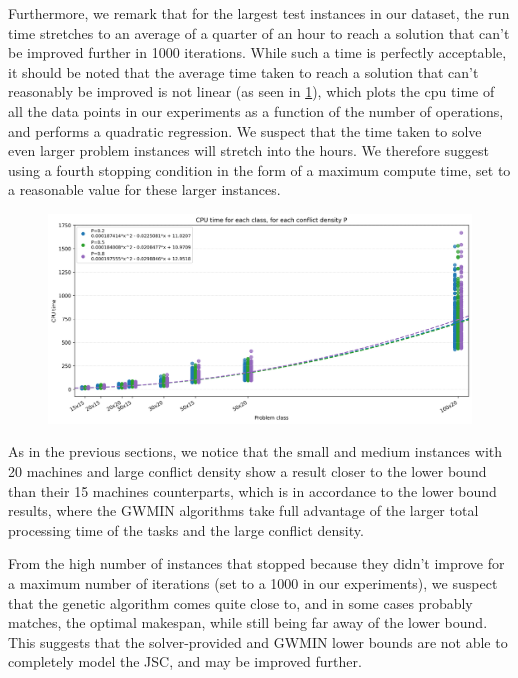 \documentclass{mimosis}
\begin{document}
Furthermore, we remark that for the largest test instances in our dataset, the run time stretches to an average of a quarter of an hour to reach a solution that can't be improved further in 1000 iterations. While such a time is perfectly acceptable, it should be noted that the average time taken to reach a solution that can't reasonably be improved is not linear (as seen in \cref{fig:quad_reg_cputime}), which plots the cpu time of all the data points in our experiments as a function of the number of operations, and performs a quadratic regression. We suspect that the time taken to solve even larger problem instances will stretch into the hours. We therefore suggest using a fourth stopping condition in the form of a maximum compute time, set to a reasonable value for these larger instances. 

\begin{figure}
\includegraphics[width=15cm]{cpu_time_evolution.png} 
\centering
{}
\label{fig:quad_reg_cputime}
\end{figure}

As in the previous sections, we notice that the small and medium instances with 20 machines and large conflict density show a result closer to the lower bound than their 15 machines counterparts, which is in accordance to the lower bound results, where the GWMIN algorithms take full advantage of the larger total processing time of the tasks and the large conflict density.

From the high number of instances that stopped because they didn't improve for a maximum number of iterations (set to a 1000 in our experiments), we suspect that the genetic algorithm comes quite close to, and in some cases probably matches, the optimal makespan, while still being far away of the lower bound. This suggests that the solver-provided and GWMIN lower bounds are not able to completely model the JSC, and may be improved further. 
\end{document}
